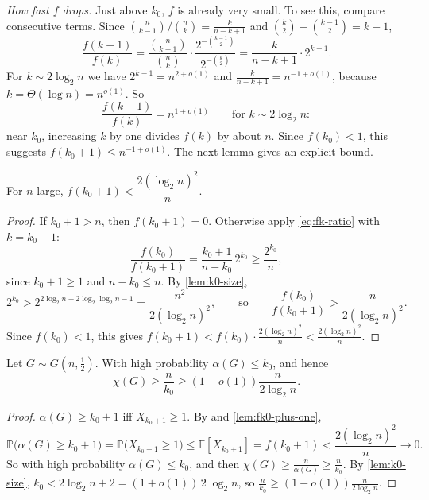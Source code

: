 \emph{How fast \(f\) drops.} Just above \(k_{0}\), \(f\) is already very small. To see this, compare consecutive terms. Since \(\binom{n}{k-1} / \binom{n}{k} = \frac{k}{n-k+1}\) and \(\binom{k}{2} - \binom{k-1}{2} = k - 1\),
\begin{equation}\label{eq:fk-ratio}
    \frac{f(k-1)}{f(k)}
    = \frac{\binom{n}{k-1}}{\binom{n}{k}} \cdot \frac{2^{-\binom{k-1}{2}}}{2^{-\binom{k}{2}}}
    = \frac{k}{n-k+1} \cdot 2^{k-1} .
\end{equation}
For \(k \sim 2 \log_{2} n\) we have \(2^{k-1} = n^{2 + o(1)}\) and \(\frac{k}{n-k+1} = n^{-1 + o(1)}\), because \(k = \Theta(\log n) = n^{o(1)}\). So
\[
    \frac{f(k-1)}{f(k)} = n^{1 + o(1)} \qquad \text{for } k \sim 2 \log_{2} n :
\]
near \(k_{0}\), increasing \(k\) by one divides \(f(k)\) by about \(n\). Since \(f(k_{0}) < 1\), this suggests \(f(k_{0} + 1) \le n^{-1 + o(1)}\). The next lemma gives an explicit bound.

\begin{lemma}\label{lem:fk0-plus-one}
    For \(n\) large, \(f(k_{0} + 1) < \dfrac{2 (\log_{2} n)^{2}}{n}\).
\end{lemma}

\begin{proof}
    If \(k_{0} + 1 > n\), then \(f(k_{0} + 1) = 0\). Otherwise apply \eqref{eq:fk-ratio} with \(k = k_{0} + 1\):
    \[
        \frac{f(k_{0})}{f(k_{0} + 1)} = \frac{k_{0} + 1}{n - k_{0}} \, 2^{k_{0}} \ge \frac{2^{k_{0}}}{n} ,
    \]
    since \(k_{0} + 1 \ge 1\) and \(n - k_{0} \le n\). By \autoref{lem:k0-size},
    \[
        2^{k_{0}} > 2^{2 \log_{2} n - 2 \log_{2} \log_{2} n - 1} = \frac{n^{2}}{2 (\log_{2} n)^{2}} ,
        \qquad\text{so}\qquad
        \frac{f(k_{0})}{f(k_{0} + 1)} > \frac{n}{2 (\log_{2} n)^{2}} .
    \]
    Since \(f(k_{0}) < 1\), this gives \(f(k_{0} + 1) < f(k_{0}) \cdot \frac{2 (\log_{2} n)^{2}}{n} < \frac{2 (\log_{2} n)^{2}}{n}\).
\end{proof}

\begin{proposition}\label{prop:alpha-upper}
    Let \(G \sim G(n, \frac{1}{2})\). With high probability \(\alpha(G) \le k_{0}\), and hence
    \[
        \chi(G) \ge \frac{n}{k_{0}} \ge (1 - o(1)) \frac{n}{2 \log_{2} n} .
    \]
\end{proposition}

\begin{proof}
    \(\alpha(G) \ge k_{0} + 1\) iff \(X_{k_{0}+1} \ge 1\). By  and \autoref{lem:fk0-plus-one},
    \[
        \mathbb{P}\bigl( \alpha(G) \ge k_{0} + 1 \bigr) = \mathbb{P}\bigl( X_{k_{0}+1} \ge 1 \bigr) \le \mathbb{E}[X_{k_{0}+1}] = f(k_{0} + 1) < \frac{2 (\log_{2} n)^{2}}{n} \longrightarrow 0 .
    \]
    So with high probability \(\alpha(G) \le k_{0}\), and then \(\chi(G) \ge \frac{n}{\alpha(G)} \ge \frac{n}{k_{0}}\). By \autoref{lem:k0-size}, \(k_{0} < 2 \log_{2} n + 2 = (1 + o(1)) \, 2 \log_{2} n\), so \(\frac{n}{k_{0}} \ge (1 - o(1)) \frac{n}{2 \log_{2} n}\).
\end{proof}

